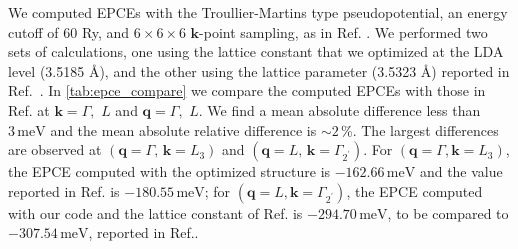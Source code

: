 \documentclass[journal=jctcce,manuscript=article]{achemso}
\newcommand{\bfk}{{\mathbf{k}}}
\newcommand{\bfq}{{\mathbf{q}}}
\begin{document}
We computed EPCEs with the Troullier-Martins type pseudopotential\cite{troullier1991efficient}, an energy cutoff of 60 Ry, and $6\times 6\times 6$ $\bfk$-point sampling, as in Ref. . We performed two sets of calculations, one using the lattice constant that we optimized at the LDA level (3.5185 \AA), and the other using the lattice parameter (3.5323 \AA) reported in Ref.~. In \autoref{tab:epce_compare} we compare the computed EPCEs with those in Ref. at $\bfk = \Gamma,\,\,L$ and $\bfq = \Gamma,\,\, L$. We find a mean absolute difference less than $3\,\mathrm{meV}$ and the mean absolute relative difference is $\sim 2\,$\%. The largest differences are observed at $(\bfq=\Gamma,\,\bfk=L_3)$ and $(\bfq=L,\,\bfk=\Gamma_{2^\prime})$. For $(\bfq=\Gamma,\bfk=L_3)$, the EPCE computed with the optimized structure is $-162.66\,\mathrm{meV}$ and the value reported in Ref. is $-180.55\,\mathrm{meV}$; for $(\bfq=L,\bfk=\Gamma_{2^\prime})$, the EPCE computed with our code and the lattice constant of Ref. is $-294.70\,\mathrm{meV}$, to be compared to $-307.54\,\mathrm{meV}$, reported in Ref.. 
\end{document}
